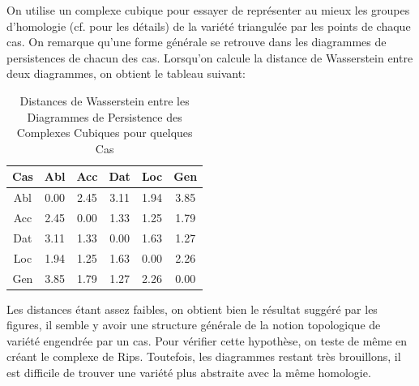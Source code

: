 \documentclass{cours}
\begin{document}
    On utilise un complexe cubique pour essayer de représenter au mieux les groupes d'homologie (cf.  pour les détails) de la variété triangulée par les points de chaque cas.
    On remarque qu'une forme générale se retrouve dans les diagrammes de persistences de chacun des cas.
    Lorsqu'on calcule la distance de Wasserstein entre deux diagrammes, on obtient le tableau suivant:
    \begin{table}[H]
        \centering
        \begin{tabular}{c|ccccc}
            \toprule
            Cas & Abl & Acc & Dat & Loc & Gen\\
            \midrule
            Abl & 0.00 & 2.45 & 3.11 & 1.94 & 3.85\\
            Acc & 2.45 & 0.00 & 1.33 & 1.25 & 1.79\\
            Dat & 3.11 & 1.33 & 0.00 & 1.63 & 1.27\\
            Loc & 1.94 & 1.25 & 1.63 & 0.00 & 2.26\\
            Gen & 3.85 & 1.79 & 1.27 & 2.26 & 0.00\\
            \bottomrule
        \end{tabular}
        \caption{Distances de Wasserstein entre les Diagrammes de Persistence des Complexes Cubiques pour quelques Cas}
    \end{table}
    Les distances étant assez faibles, on obtient bien le résultat suggéré par les figures, il semble y avoir une structure générale de la notion topologique de variété engendrée par un cas.
    Pour vérifier cette hypothèse, on teste de même en créant le complexe de Rips.
    Toutefois, les diagrammes restant très brouillons, il est difficile de trouver une variété plus abstraite avec la même homologie.
\end{document}
